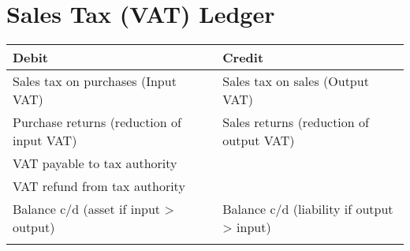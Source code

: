 

\section*{Sales Tax (VAT) Ledger}

\begin{tabular}{@{}p{5cm}p{5cm}p{5cm}@{}}
\toprule
\textbf{Debit} & \textbf{} & \textbf{Credit} \\
\midrule
Sales tax on purchases (Input VAT) & & Sales tax on sales (Output VAT) \\
Purchase returns (reduction of input VAT) & & Sales returns (reduction of output VAT) \\
VAT payable to tax authority & & \\
VAT refund from tax authority & & \\
Balance c/d (asset if input > output) & & Balance c/d (liability if output > input) \\
\midrule
 & & \\
\bottomrule
\end{tabular}


